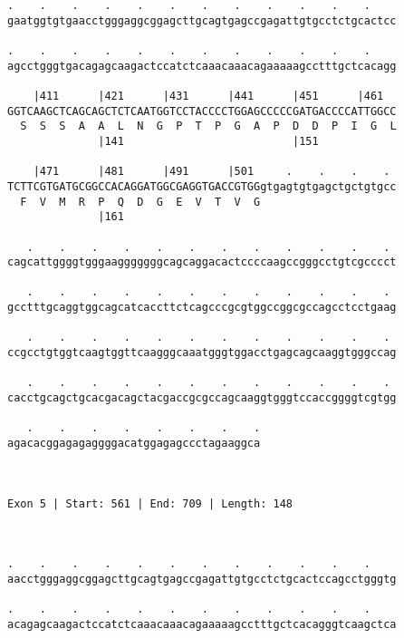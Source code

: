 \documentclass{article}
\begin{document}
\begin{Verbatim}
.    .    .    .    .    .    .    .    .    .    .    .    
gaatggtgtgaacctgggaggcggagcttgcagtgagccgagattgtgcctctgcactcc
                                                            
.    .    .    .    .    .    .    .    .    .    .    .    
agcctgggtgacagagcaagactccatctcaaacaaacagaaaaagcctttgctcacagg
                                                            
    |411      |421      |431      |441      |451      |461  
GGTCAAGCTCAGCAGCTCTCAATGGTCCTACCCCTGGAGCCCCCGATGACCCCATTGGCC
  S  S  S  A  A  L  N  G  P  T  P  G  A  P  D  D  P  I  G  L
              |141                          |151            
  
    |471      |481      |491      |501     .    .    .    . 
TCTTCGTGATGCGGCCACAGGATGGCGAGGTGACCGTGGgtgagtgtgagctgctgtgcc
  F  V  M  R  P  Q  D  G  E  V  T  V  G                     
              |161                                          
  
   .    .    .    .    .    .    .    .    .    .    .    . 
cagcattggggtgggaagggggggcagcaggacactccccaagccgggcctgtcgcccct
                                                            
   .    .    .    .    .    .    .    .    .    .    .    . 
gcctttgcaggtggcagcatcaccttctcagcccgcgtggccggcgccagcctcctgaag
                                                            
   .    .    .    .    .    .    .    .    .    .    .    . 
ccgcctgtggtcaagtggttcaagggcaaatgggtggacctgagcagcaaggtgggccag
                                                            
   .    .    .    .    .    .    .    .    .    .    .    . 
cacctgcagctgcacgacagctacgaccgcgccagcaaggtgggtccaccggggtcgtgg
                                                            
   .    .    .    .    .    .    .    .
agacacggagagaggggacatggagagccctagaaggca
                                       
                                       
 
Exon 5 | Start: 561 | End: 709 | Length: 148



.    .    .    .    .    .    .    .    .    .    .    .    
aacctgggaggcggagcttgcagtgagccgagattgtgcctctgcactccagcctgggtg
                                                            
.    .    .    .    .    .    .    .    .    .    .    .    
acagagcaagactccatctcaaacaaacagaaaaagcctttgctcacagggtcaagctca
                                                            

\end{Verbatim}
\end{document}
